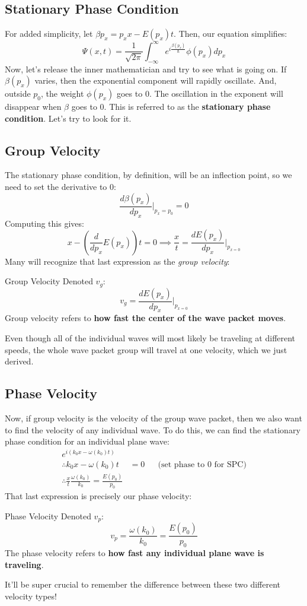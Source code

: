       \subsection{Stationary Phase Condition}
        For added simplicity, let $\beta{p_x} = p_xx - E(p_x)t$. Then, our equation simplifies:
        $$\Psi(x,t) = \frac{1}{\sqrt{2\pi}}\int_{-\infty}^{\infty}e^{i\frac{\beta(p_x)}{\hbar}}\phi(p_x)dp_x$$
        Now, let's release the inner mathematician and try to see what is going on. If $\beta(p_x)$ varies, then the exponential component will rapidly oscillate. And, outside $p_0$, the weight $\phi(p_x)$ goes to $0$. The oscillation in the exponent will disappear when $\beta$ goes to $0$. This is referred to as the \textbf{stationary phase condition}. Let's try to look for it.

      \subsection{Group Velocity}
        The stationary phase condition, by definition, will be an inflection point, so we need to set the derivative to $0$:
        $$\frac{d\beta(p_x)}{dp_x}\Biggr|_{p_x = p_0} = 0$$
        Computing this gives:
        $$x - \left(\frac{d}{dp_x}E(p_x)\right)t = 0 \implies \frac{x}{t} = \frac{dE(p_x)}{dp_x}\Biggr|_{p_{x=0}}$$
        Many will recognize that last expression as the \textit{group velocity}:
        \begin{definition}{Group Velocity}{}
          Denoted $v_g$: $$v_g = \frac{dE(p_x)}{dp_x}\Biggr|_{p_{x=0}}$$
          Group velocity refers to \textbf{how fast the center of the wave packet moves}.
        \end{definition}
        Even though all of the individual waves will most likely be traveling at different speeds, the whole wave packet group will travel at one velocity, which we just derived.

      \subsection{Phase Velocity}
        Now, if group velocity is the velocity of the group wave packet, then we also want to find the velocity of any individual wave. To do this, we can find the stationary phase condition for an individual plane wave:
        \begin{align*}
          e^{i(k_0x - \omega(k_0)t)}\\
          \therefore k_0x - \omega(k_0)t &= 0 &&\text{(set phase to $0$ for SPC)}\\
          \therefore \frac{x}{t} \frac{\omega(k_0)}{k_0} = \frac{E(p_0)}{p_0}
        \end{align*}
        That last expression is precisely our phase velocity:
        \begin{definition}{Phase Velocity}{}
          Denoted $v_p$: $$v_p = \frac{\omega(k_0)}{k_0} = \frac{E(p_0)}{p_0}$$
          The phase velocity refers to \textbf{how fast any individual plane wave is traveling}.
        \end{definition}
        It'll be super crucial to remember the difference between these two different velocity types!

